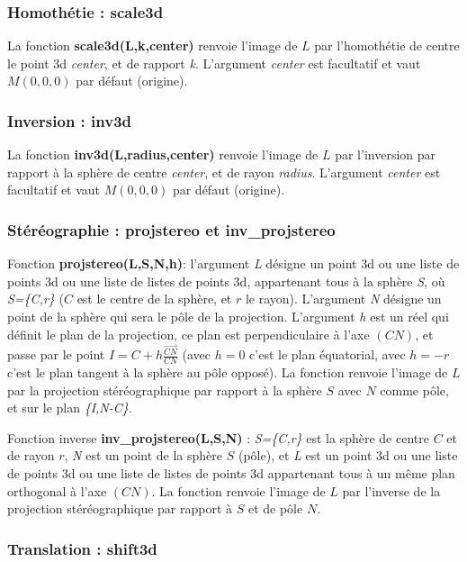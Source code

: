 \subsubsection{Homothétie : scale3d}

La fonction \textbf{scale3d(L,k,center)} renvoie l'image de $L$ par l'homothétie de centre le point 3d \emph{center}, et de rapport \emph{k}. L'argument \emph{center} est facultatif et vaut $M(0,0,0)$ par défaut (origine).

\subsubsection{Inversion : inv3d}

La fonction \textbf{inv3d(L,radius,center)} renvoie l'image de $L$ par l'inversion par rapport à la sphère de centre  \emph{center}, et de rayon \emph{radius}.  L'argument \emph{center} est facultatif et vaut $M(0,0,0)$ par défaut (origine).

\subsubsection{Stéréographie : projstereo et inv\_projstereo}

Fonction \textbf{projstereo(L,S,N,h)}: l'argument \emph{L} désigne un point 3d ou une liste de points 3d ou une liste de listes de points 3d, appartenant tous à la sphère \emph{S}, où \emph{S=\{C,r\}} ($C$ est le centre de la sphère, et $r$ le rayon). L'argument \emph{N} désigne un point de la sphère qui sera le pôle de la projection. L'argument \emph{h} est un réel qui définit le plan de la projection, ce plan est perpendiculaire à l'axe $(CN)$, et passe par le point $I=C+h \frac{\vec{CN}}{CN}$ (avec $h=0$ c'est le plan équatorial, avec $h=-r$ c'est le plan tangent à la sphère au pôle opposé). La fonction renvoie l'image de $L$ par la projection stéréographique par rapport à la sphère $S$ avec $N$ comme pôle, et sur le plan \emph{\{I,N-C\}}.

Fonction inverse \textbf{inv\_projstereo(L,S,N)} : \emph{S=\{C,r\}} est la sphère de centre $C$ et de rayon $r$, \emph{N} est un point de la sphère $S$ (pôle), et \emph{L} est un point 3d ou une liste de points 3d ou une liste de listes de points 3d appartenant tous à un même plan orthogonal à l'axe $(CN)$. La fonction renvoie l'image de $L$ par l'inverse de la projection stéréographique par rapport à $S$ et de pôle $N$.


\subsubsection{Translation : shift3d}

